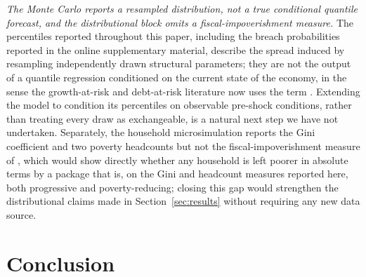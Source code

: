 \documentclass[11pt,a4paper]{article}
\begin{document}
\emph{The Monte Carlo reports a resampled distribution, not a true conditional quantile forecast, and the distributional block omits a fiscal-impoverishment measure.} The percentiles reported throughout this paper, including the breach probabilities reported in the online supplementary material, describe the spread induced by resampling independently drawn structural parameters; they are not the output of a quantile regression conditioned on the current state of the economy, in the sense the growth-at-risk and debt-at-risk literature now uses the term \citep{prasadetal2019growthatrisk,lianpresbiterowiriadinata2020,furcerietal2025debtrisk}. Extending the model to condition its percentiles on observable pre-shock conditions, rather than treating every draw as exchangeable, is a natural next step we have not undertaken. Separately, the household microsimulation reports the Gini coefficient and two poverty headcounts but not the fiscal-impoverishment measure of \citet{higginslustig2016}, which would show directly whether any household is left poorer in absolute terms by a package that is, on the Gini and headcount measures reported here, both progressive and poverty-reducing; closing this gap would strengthen the distributional claims made in Section~\ref{sec:results} without requiring any new data source.

\section{Conclusion}
\label{sec:conclusion}
\end{document}
